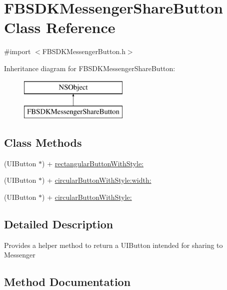 \hypertarget{interface_f_b_s_d_k_messenger_share_button}{}\section{F\+B\+S\+D\+K\+Messenger\+Share\+Button Class Reference}
\label{interface_f_b_s_d_k_messenger_share_button}


{\ttfamily \#import $<$F\+B\+S\+D\+K\+Messenger\+Button.\+h$>$}

Inheritance diagram for F\+B\+S\+D\+K\+Messenger\+Share\+Button\+:\begin{figure}[H]
\begin{center}
\leavevmode
\includegraphics[height=2.000000cm]{interface_f_b_s_d_k_messenger_share_button}
\end{center}
\end{figure}
\subsection*{Class Methods}
\begin{DoxyCompactItemize}
\item 
(U\+I\+Button $\ast$) + \hyperlink{interface_f_b_s_d_k_messenger_share_button_a6604ed0d6d993d35041de800ee68482d}{rectangular\+Button\+With\+Style\+:}
\item 
(U\+I\+Button $\ast$) + \hyperlink{interface_f_b_s_d_k_messenger_share_button_adebb3a3ff76fdefd9642200107159ed5}{circular\+Button\+With\+Style\+:width\+:}
\item 
(U\+I\+Button $\ast$) + \hyperlink{interface_f_b_s_d_k_messenger_share_button_ac580a1fe4a443553471f8e1b3968b5c8}{circular\+Button\+With\+Style\+:}
\end{DoxyCompactItemize}


\subsection{Detailed Description}
Provides a helper method to return a U\+I\+Button intended for sharing to Messenger 

\subsection{Method Documentation}
\hypertarget{interface_f_b_s_d_k_messenger_share_button_ac580a1fe4a443553471f8e1b3968b5c8}{}
